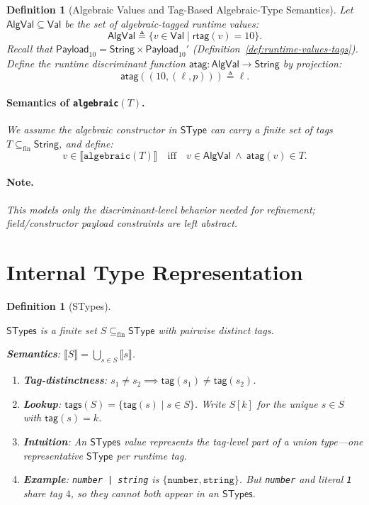 \documentclass[11pt]{article}
\newtheorem{definition}[theorem]{Definition}
\newcommand{\sem}[1]{\llbracket #1 \rrbracket}
\newcommand{\String}{\mathsf{String}}
\newcommand{\AlgVal}{\mathsf{AlgVal}}
\newcommand{\SType}{\mathsf{SType}}
\newcommand{\STypes}{\mathsf{STypes}}
\newcommand{\tagfn}{\mathsf{tag}}
\newcommand{\tags}{\mathsf{tags}}
\newcommand{\rtag}{\mathsf{rtag}}
\newcommand{\Val}{\mathsf{Val}}
\newcommand{\Payload}{\mathsf{Payload}}
\begin{document}
\begin{definition}[Algebraic Values and Tag-Based Algebraic-Type Semantics]
\label{def:algebraic-semantics}
Let $\AlgVal \subseteq \Val$ be the set of algebraic-tagged runtime values:
\[
\AlgVal \triangleq \{ v \in \Val \mid \rtag(v)=10\}.
\]
Recall that $\Payload_{10}=\String \times \Payload_{10}'$ (Definition~\ref{def:runtime-values-tags}).
Define the runtime discriminant function $\mathsf{atag} : \AlgVal \to \String$ by projection:
\[
\mathsf{atag}((10,(\ell,p))) \triangleq \ell.
\]
\paragraph{Semantics of \texttt{algebraic}$(T)$.}
We assume the algebraic constructor in $\SType$ can carry a finite set of tags $T \subseteq_{\mathrm{fin}} \String$,
and define:
\[
v \in \sem{\texttt{algebraic}(T)}
\quad\text{iff}\quad
v \in \AlgVal \ \land\  \mathsf{atag}(v) \in T.
\]
\paragraph{Note.}
This models only the discriminant-level behavior needed for refinement; field/constructor payload constraints are left abstract.
\end{definition}

\section{Internal Type Representation}

\begin{definition}[STypes]
\label{def:stypes}
\leavevmode
\begin{keydef}
\(\STypes\) is a finite set \(S \subseteq_{\mathrm{fin}} \SType\) with pairwise distinct tags.

\smallskip
\textbf{Semantics}: $\sem{S} = \bigcup_{s \in S} \sem{s}$.
\end{keydef}

\begin{enumerate}
\item \textbf{Tag-distinctness}: $s_1 \neq s_2 \implies \tagfn(s_1) \neq \tagfn(s_2)$.

\item \textbf{Lookup}: $\tags(S) = \{\tagfn(s) \mid s \in S\}$. Write $S[k]$ for the unique $s \in S$ with $\tagfn(s)=k$.

\item \textbf{Intuition}: An $\STypes$ value represents the \emph{tag-level} part of a union type---one representative $\SType$ per runtime tag.

\item \textbf{Example}: \texttt{number | string} is $\{\texttt{number}, \texttt{string}\}$.
  But \texttt{number} and literal \texttt{1} share tag $4$, so they cannot both appear in an $\STypes$.
\end{enumerate}
\end{definition}
\end{document}
